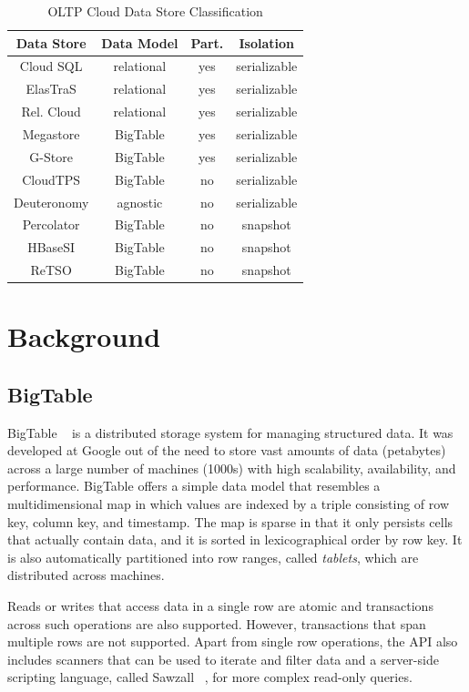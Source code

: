\documentclass[10pt,final,journal]{IEEEtran}
\begin{document}
\begin{table}[!t]
\renewcommand{\arraystretch}{1.3}
\caption{OLTP Cloud Data Store Classification}
\label{classification}
\centering
\begin{tabular}{|c|c|c|c|}
\hline
\bfseries Data Store  & \bfseries Data Model & \bfseries  Part. & \bfseries Isolation \\
\hline
\hline
Cloud SQL & relational & yes & serializable \\
ElasTraS & relational & yes & serializable \\
Rel. Cloud & relational & yes & serializable \\
Megastore & BigTable & yes & serializable \\
G-Store & BigTable & yes & serializable \\
CloudTPS & BigTable & no & serializable \\
Deuteronomy & agnostic & no &serializable \\
Percolator & BigTable & no & snapshot \\
HBaseSI & BigTable & no & snapshot \\
ReTSO & BigTable & no & snapshot \\
\hline
\end{tabular}
\end{table}



\section{Background}

\subsection{BigTable}
BigTable ~\cite{Chang:2006:BDS:1267308.1267323} is a distributed storage system for managing structured data. It was developed at Google out of the need to store vast amounts of data (petabytes) across a large number of machines (1000s) with high scalability, availability, and performance. BigTable offers a simple data model that resembles a multidimensional map in which values are indexed by a triple consisting of row key, column key, and timestamp. The map is sparse in that it only persists cells that actually contain data, and it is sorted in lexicographical order by row key. It is also automatically partitioned into row ranges, called \emph{tablets}, which are distributed across machines.

Reads or writes that access data in a single row are atomic and transactions across such operations are also supported. However, transactions that span multiple rows are not supported. Apart from single row operations, the API also includes scanners that can be used to iterate and filter data and a server-side scripting language, called Sawzall ~\cite{Pike:2005}, for more complex read-only queries.
\end{document}
